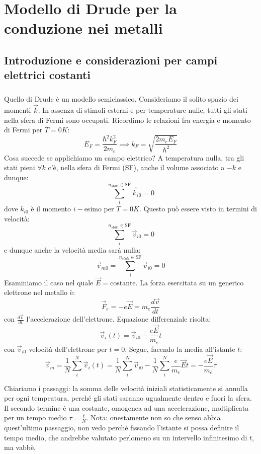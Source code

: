 \documentclass{book}
\begin{document}
\chapter{Modello di Drude per la conduzione nei metalli}
    \section{Introduzione e considerazioni per campi elettrici costanti}
        \paragraph{}
        Quello di Drude è un modello semiclassico. Consideriamo il solito spazio dei momenti $\vec{k}$. In assenza di stimoli esterni e per temperature nulle, tutti gli stati nella sfera di Fermi sono occupati. Ricordimo le relazioni fra energia e momento di Fermi per $T=0K$:
        $$E_{F} = \frac{\hbar ^{2}k^{2} _{F}}{2m_{e}} \implies k_{F} = \sqrt{\frac{2m_{e}E_{F}}{\hbar ^{2}}}$$
        Cosa succede se applichiamo un campo elettrico?
        A temperatura nulla, tra gli stati pieni $\forall k$ c'è, nella sfera di Fermi (SF), anche il volume associato a $-k$ e dunque:
        $$\sum_{i} ^{n_{stati} \in \textrm{SF}} \vec{k}_{i0} = 0$$
        dove $k_{i0}$ è il momento $i-$esimo per $T=0K$.
        Questo può essere visto in termini di velocità:
         $$\sum_{i} ^{n_{stati} \in \textrm{SF}} \vec{v}_{i0} = 0$$
         e dunque anche la velocità media sarà nulla:
         $$ \vec{v}_{m0} = \sum_{i} ^{n_{stati} \in \textrm{SF}} \vec{v}_{i0} = 0$$
         Esaminiamo  il caso nel quale $\vec{E} = \textrm{costante}$. La forza esercitata su un generico elettrone nel metallo è:
         $$\vec{F}_{e} = -e\vec{E} = m_{e} \frac{d\vec{v}}{dt}$$
         con $\displaystyle \frac{d \vec{v}}{dt}$ l'accelerazione dell'elettrone. Equazione differenziale risolta:
         $$\vec{v}_{i} (t) = \vec{v}_{i0} - \frac{e \vec{E}}{m_{e}} t$$
         con $\vec{v}_{i0}$ velocità dell'elettrone per $t=0$.
         Segue, facendo la media all'istante $t$:
         $$\vec{v}_{m} = \frac{1}{N} \sum_{i} ^{N} \vec{v}_{i} (t) = \frac{1}{N} \sum_{i} ^{N}\vec{v}_{i0} - \frac{1}{N} \sum_{i} ^{N} \frac{e}{m_{e}}\vec{E}t = - \frac{e \vec{E}}{m_{e}} \tau$$

         Chiariamo i passaggi: la somma delle velocità iniziali statisticamente si annulla per ogni tempeatura, perché gli stati saranno ugualmente dentro e fuori la sfera. Il secondo termine è una costante, omogenea ad una accelerazione, moltiplicata per un tempo medio $\tau = \frac{t}{N}$. Nota: onestamente non so che senso abbia quest'ultimo passaggio, non vedo perché fissando l'istante si possa definire il tempo medio, che andrebbe valutato perlomeno su un intervello infinitesimo di $t$, ma vabbè. 
\end{document}
